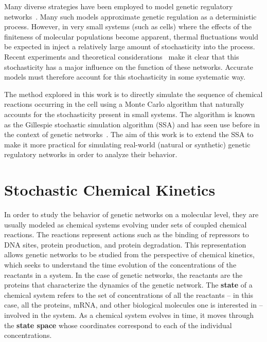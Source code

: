 \documentclass[english,letterpaper,12pt]{article}
\newcommand{\defkeywd}[1]{\textbf{#1}}
\begin{document}
\begin{doublespacing}
Many diverse strategies have been employed to model genetic regulatory networks~\cite{review-in-numero}\cite{bistable-modeling}\cite{gillespie-ssa}\cite{langevin-limit}. Many such models  approximate genetic regulation as a deterministic process. However, in very small systems (such as cells) where the effects of the finiteness of molecular populations become apparent, thermal fluctuations would be expected in inject a relatively large amount of stochasticity into the process. Recent experiments and theoretical considerations~\cite{ecoli-decision}\cite{stoch-theories}\cite{stoch-single-cell} make it clear that this stochasticity has a major influence on the function of these networks. Accurate models must therefore account for this stochasticity in some systematic way. 

The method explored in this work is to directly simulate the sequence of chemical reactions occurring in the cell using a Monte Carlo algorithm that naturally accounts for the stochasticity present in small systems. The algorithm is known as the Gillespie stochastic simulation algorithm (SSA) and has seen use before in the context of genetic networks~\cite{we-chemkin}\cite{stoch-sys-bio}. The aim of this work is to extend the SSA to make it more practical for simulating real-world (natural or synthetic) genetic regulatory networks in order to analyze their behavior.


\section{Stochastic Chemical Kinetics} %
\label{sec:chemkin}

In order to study the behavior of genetic networks on a molecular level, they are usually modeled as chemical systems evolving under sets of coupled chemical reactions. The reactions represent actions such as the binding of repressors to DNA sites, protein production, and protein degradation. This representation allows genetic networks to be studied from the perspective of chemical kinetics, which seeks to understand the time evolution of the concentrations of the reactants in a system. In the case of genetic networks, the reactants are the proteins that characterize the dynamics of the genetic network. The \defkeywd{state} of a chemical system refers to the set of concentrations of all the reactants -- in this case, all the proteins, mRNA, and other biological molecules one is interested in -- involved in the system. As a chemical system evolves in time, it moves through the \defkeywd{state space} whose coordinates correspond to each of the individual concentrations.


\end{doublespacing}
\end{document}
